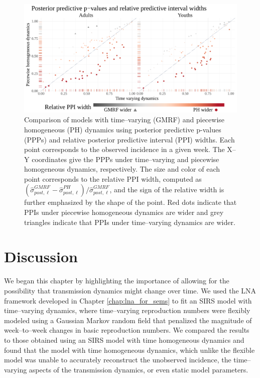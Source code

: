 \begin{figure}[htbp]
	\centering
	\includegraphics[width=\linewidth]{figures/flu_rw_const_ppicomp}
	\caption[Comparison with posterior predictive p-values and relative predictive interval widths for SIRS models with time--varying and piecewise homogeneous dynamics.]{Comparison of models with time--varying (GMRF) and piecewise homogeneous (PH) dynamics using posterior predictive p-values (PPPs) and relative posterior predictive interval (PPI) widths. Each point corresponds to the observed incidence in a given week. The X--Y coordinates give the PPPs under time--varying and piecewise homogeneous dynamics, respectively. The size and color of each point corresponds to the relative PPI width, computed as $ (\widehat{\sigma}_{post,\ell}^{GMRF} - \widehat{\sigma}_{post,\ell}^{PH})/\widehat{\sigma}_{post,\ell}^{GMRF} $, and the sign of the relative width is further emphasized by the shape of the point. Red dots indicate that PPIs under piecewise homogeneous dynamics are wider and grey triangles indicate that PPIs under time--varying dynamics are wider.}
	\label{fig:flu_rw_const_ppicomp}
\end{figure}

\section{Discussion}
\label{sec:flu_discussion}

We began this chapter by highlighting the importance of allowing for the possibility that transmission dynamics might change over time. We used the LNA framework developed in Chapter \ref{chap:lna_for_sems} to fit an SIRS model with time--varying dynamics, where time--varying reproduction numbers were flexibly modeled using a Gaussian Markov random field that penalized the magnitude of week--to--week changes in basic reproduction numbers. We compared the results to those obtained using an SIRS model with time homogeneous dynamics and found that the model with time homogeneous dynamics, which unlike the flexible model was unable to accurately reconstruct the unobserved incidence, the time--varying aspects of the transmission dynamics, or even static model parameters.

